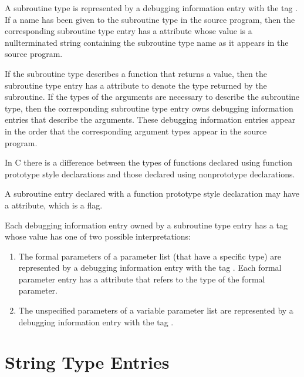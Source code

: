 A subroutine type is represented by a debugging information
entry with the 
tag . 
If a name has
been given to the subroutine type in the source program,
then the corresponding subroutine type entry has a 
attribute whose value is a null\dash terminated string containing
the subroutine type name as it appears in the source program.

If the subroutine type describes a function that returns
a value, then the subroutine type entry has a 
attribute to denote the type returned by the subroutine. If
the types of the arguments are necessary to describe the
subroutine type, then the corresponding subroutine type
entry owns debugging information entries that describe the
arguments. These debugging information entries appear in the
order that the corresponding argument types appear in the
source program.

In C there is a difference between the types of functions
declared using function prototype style declarations and
those declared using non\dash prototype declarations.

A subroutine entry declared with a function prototype style
declaration may have a  attribute, which is
a flag.

Each debugging information entry owned by a subroutine
type entry has a tag whose value has one of two possible
interpretations:

\begin{enumerate}[1.]
\item The formal parameters of a parameter list (that have a
specific type) are represented by a debugging information entry
with the tag . Each formal parameter
entry has a  attribute that refers to the type of
the formal parameter.

\item The unspecified parameters of a variable parameter list
are represented by a debugging information entry with the
tag .
\end{enumerate}



\section{String Type Entries}
\label{chap:stringtypeentries}


